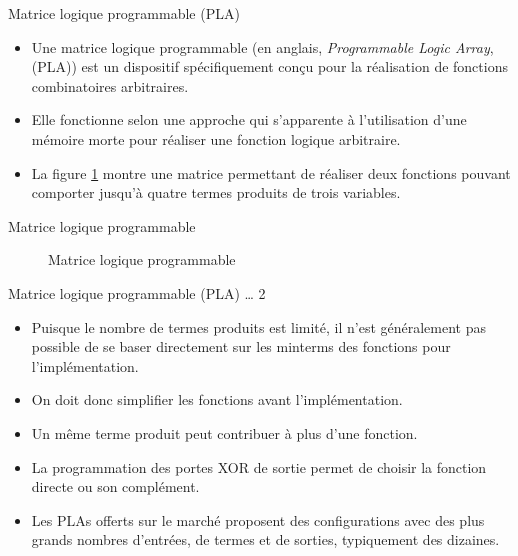 \documentclass[presentation]{beamer}
\begin{document}
\begin{frame}[label={sec:org3d1e205}]{Matrice logique programmable (PLA)}
\begin{itemize}
\item Une \alert{matrice logique programmable} (en anglais, \emph{Programmable Logic Array}, (PLA)) est un dispositif spécifiquement conçu pour la réalisation de fonctions combinatoires arbitraires.

\item Elle fonctionne selon une approche qui s'apparente à l'utilisation d'une mémoire morte pour réaliser une fonction logique arbitraire.

\item La figure \ref{fig:org88f1f45} montre une matrice permettant de réaliser deux fonctions pouvant comporter jusqu'à quatre termes produits de trois variables.
\end{itemize}
\end{frame}

\begin{frame}[label={sec:org0c34b95}]{Matrice logique programmable}
\begin{figure}[htbp]
\centering

\caption{\label{fig:org88f1f45}Matrice logique programmable}
\end{figure}
\end{frame}

\begin{frame}[label={sec:org7207d6a}]{Matrice logique programmable (PLA) \ldots{} 2}
\begin{itemize}
\item Puisque le nombre de termes produits est limité, il n'est généralement pas possible de se baser directement sur les minterms des fonctions pour l'implémentation.

\item On doit donc simplifier les fonctions avant l'implémentation.

\item Un même terme produit peut contribuer à plus d'une fonction.

\item La programmation des portes XOR de sortie permet de choisir la fonction directe ou son complément.

\item Les PLAs offerts sur le marché proposent des configurations avec des plus grands nombres d'entrées, de termes et de sorties, typiquement des dizaines.
\end{itemize}
\end{frame}
\end{document}
